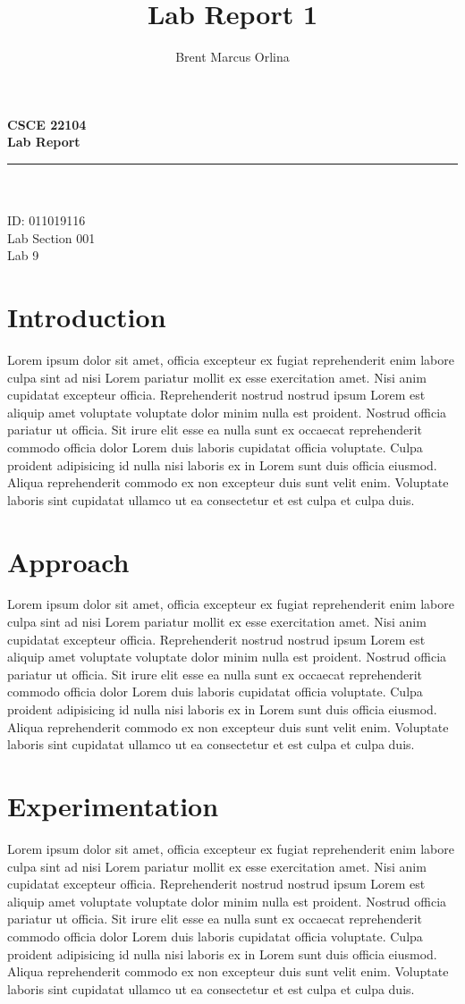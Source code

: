 \documentclass[11pt]{report}
\makeatletter
\newcommand{\@labsection}{000}
\newcommand{\labsection}[1]{
    \renewcommand{\@labsection}{#1}
}
\newcommand{\@labnumber}{0}
\newcommand{\labnumber}[1]{
    \renewcommand{\@labnumber}{#1}
}
\newcommand{\@shortsubmitted}{1/1/70}
\newcommand{\shortsubmitted}[1]{
    \renewcommand{\@shortsubmitted}{#1}
}
\renewcommand{\maketitle}{
    \newgeometry{left=1in, right=1in, top=1.75in, textheight=8.25in}
    \singlespacing
    \begin{center}
        {\huge \bf CSCE 22104} \\
        \vspace{2.5em}
        {\Large \bf Lab Report} \\
        \vspace{2em}
        \noindent\rule{20em}{0.4pt} \\
        \vspace{1em}
        {\Large \@author} \\
        \vspace{.75em}
        {\normalsize ID: 011019116} \\
        \vspace{.75em}
        {\normalsize Lab Section \@labsection} \\
        \vspace{.75em}
        {\normalsize Lab \@labnumber} \\
    \end{center}
    \newpage
    \restoregeometry
}
\makeatother
\begin{document}
\title{Lab Report 1}
\author{Brent Marcus Orlina}

\labsection{001}
\labnumber{9}

\shortsubmitted{4/16/25}

\maketitle

\section*{Introduction}
Lorem ipsum dolor sit amet, officia excepteur ex fugiat reprehenderit enim labore culpa sint ad nisi
Lorem pariatur mollit ex esse exercitation amet. Nisi anim cupidatat excepteur officia.
Reprehenderit nostrud nostrud ipsum Lorem est aliquip amet voluptate voluptate dolor minim nulla est
proident. Nostrud officia pariatur ut officia. Sit irure elit esse ea nulla sunt ex occaecat
reprehenderit commodo officia dolor Lorem duis laboris cupidatat officia voluptate. Culpa proident
adipisicing id nulla nisi laboris ex in Lorem sunt duis officia eiusmod. Aliqua reprehenderit
commodo ex non excepteur duis sunt velit enim. Voluptate laboris sint cupidatat ullamco ut ea
consectetur et est culpa et culpa duis.

\newpage

\section*{Approach}
Lorem ipsum dolor sit amet, officia excepteur ex fugiat reprehenderit enim labore culpa sint ad nisi
Lorem pariatur mollit ex esse exercitation amet. Nisi anim cupidatat excepteur officia.
Reprehenderit nostrud nostrud ipsum Lorem est aliquip amet voluptate voluptate dolor minim nulla est
proident. Nostrud officia pariatur ut officia. Sit irure elit esse ea nulla sunt ex occaecat
reprehenderit commodo officia dolor Lorem duis laboris cupidatat officia voluptate. Culpa proident
adipisicing id nulla nisi laboris ex in Lorem sunt duis officia eiusmod. Aliqua reprehenderit
commodo ex non excepteur duis sunt velit enim. Voluptate laboris sint cupidatat ullamco ut ea
consectetur et est culpa et culpa duis.

\section*{Experimentation}
Lorem ipsum dolor sit amet, officia excepteur ex fugiat reprehenderit enim labore culpa sint ad nisi
Lorem pariatur mollit ex esse exercitation amet. Nisi anim cupidatat excepteur officia.
Reprehenderit nostrud nostrud ipsum Lorem est aliquip amet voluptate voluptate dolor minim nulla est
proident. Nostrud officia pariatur ut officia. Sit irure elit esse ea nulla sunt ex occaecat
reprehenderit commodo officia dolor Lorem duis laboris cupidatat officia voluptate. Culpa proident
adipisicing id nulla nisi laboris ex in Lorem sunt duis officia eiusmod. Aliqua reprehenderit
commodo ex non excepteur duis sunt velit enim. Voluptate laboris sint cupidatat ullamco ut ea
consectetur et est culpa et culpa duis.
\end{document}
